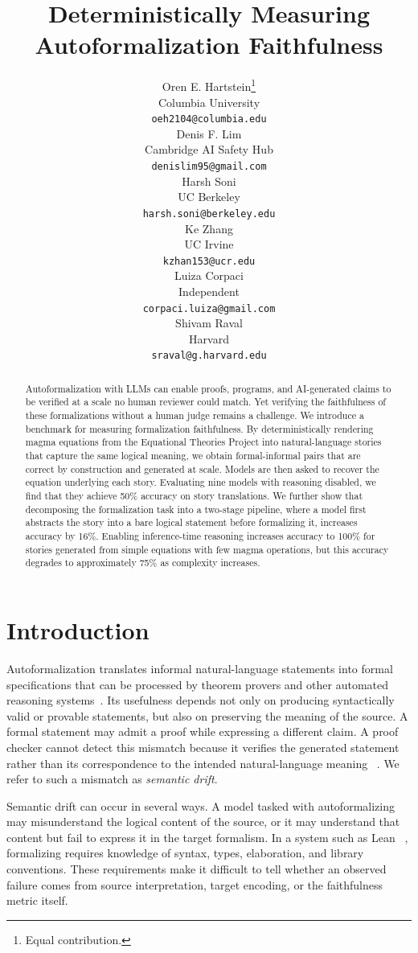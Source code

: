 \documentclass{article}
\title{Deterministically Measuring Autoformalization Faithfulness}
\author{%
  Oren E. Hartstein\thanks{Equal contribution.} \\
  Columbia University \\
  \texttt{oeh2104@columbia.edu} \\
  \And
  Denis F. Lim\footnotemark[1] \\
  Cambridge AI Safety Hub \\
  \texttt{denislim95@gmail.com} \\
  \And
  Harsh Soni \\
  UC Berkeley \\
  \texttt{harsh.soni@berkeley.edu} \\
  \AND
  Ke Zhang \\
  UC Irvine \\
  \texttt{kzhan153@ucr.edu} \\
  \And
  Luiza Corpaci \\
  Independent \\
  \texttt{corpaci.luiza@gmail.com} \\
  \And
  Shivam Raval \\
  Harvard \\
  \texttt{sraval@g.harvard.edu} \\
}
\begin{document}
\raggedbottom

\maketitle


\begin{abstract}
  Autoformalization with LLMs can enable proofs, programs, and AI-generated claims to be verified at a scale no human reviewer could match. Yet verifying the faithfulness of these formalizations without a human judge remains a challenge. We introduce a  benchmark for measuring formalization faithfulness. By deterministically rendering magma equations from the Equational Theories Project into natural-language stories that capture the same logical meaning, we obtain formal-informal pairs that are correct by construction and generated at scale. Models are then asked to recover the equation underlying each story. Evaluating nine models with reasoning disabled, we find that they achieve 50\% accuracy on story translations. We further show that decomposing the formalization task into a two-stage pipeline, where a model first abstracts the story into a bare logical statement before formalizing it, increases accuracy by 16\%. Enabling inference-time reasoning increases accuracy to 100\% for stories generated from simple equations with few magma operations, but this accuracy degrades to approximately 75\% as complexity increases.
\end{abstract}


\section{Introduction}

Autoformalization translates informal natural-language statements into formal specifications that can be processed by theorem provers and other automated
reasoning systems~\citep{wu2022autoformalization}. Its usefulness depends not only on producing syntactically valid or provable statements, but also on preserving the meaning of the source. A formal statement may admit a proof while expressing a different claim. A proof checker cannot
detect this mismatch because it verifies the generated statement rather than its correspondence to the intended natural-language meaning ~\citep{kim2026gaming}. We refer to such a mismatch as \textit{semantic drift}.

Semantic drift can occur in several ways. A model tasked with autoformalizing may misunderstand the logical content of the source, or it may understand that
 content but fail to express it in the target formalism. In a system such as Lean ~\citep{demoura2021lean4}, formalizing requires knowledge of syntax, types, elaboration, and library conventions. These requirements make it difficult to tell whether an observed failure comes from source interpretation, target
encoding, or the faithfulness metric itself.
\end{document}
